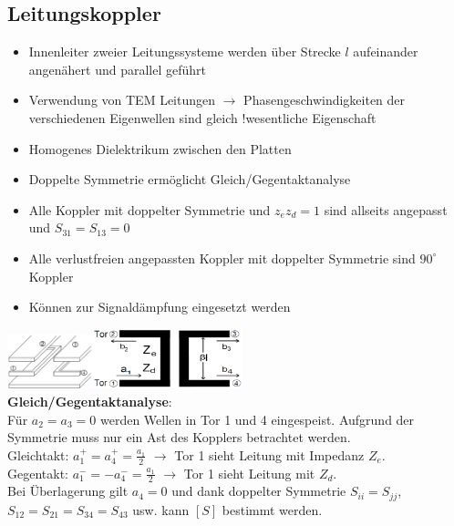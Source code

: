 \documentclass[english]{latex4ei/latex4ei_sheet}
\begin{document}
\begin{sectionbox}
	\subsection{Leitungskoppler}
	\begin{itemize}
		\item Innenleiter zweier Leitungssysteme werden über Strecke $l$ aufeinander angenähert und parallel geführt
		\item Verwendung von TEM Leitungen $\rightarrow$ Phasengeschwindigkeiten der verschiedenen Eigenwellen sind gleich !wesentliche Eigenschaft
		\item Homogenes Dielektrikum zwischen den Platten
		\item Doppelte Symmetrie ermöglicht Gleich/Gegentaktanalyse
		\item Alle Koppler mit doppelter Symmetrie und $z_ez_d = 1$ sind allseits angepasst und $S_{31} = S_{13} = 0$
		\item Alle verlustfreien angepassten Koppler mit doppelter Symmetrie sind $90^{\circ}$ Koppler
		\item Können zur Signaldämpfung eingesetzt werden
	\end{itemize}
	\includegraphics[width = 2.5cm]{./img/leitungskoppler1.png}\includegraphics[width = 4.3cm]{./img/leitungskoppler2.png}\\
	 
	\textbf{Gleich/Gegentaktanalyse}:\\
	Für $a_2 = a_3 = 0$ werden Wellen in Tor 1 und 4 eingespeist. Aufgrund der Symmetrie muss nur ein Ast des Kopplers betrachtet werden.\\
	Gleichtakt: $a_1^+ = a_4^+ = \frac{a_1}{2}$ $\rightarrow$ Tor 1 sieht Leitung mit Impedanz $Z_e$.\\
	Gegentakt: $a_1^- = -a_4^- = \frac{a_1}{2}$ $\rightarrow$ Tor 1 sieht Leitung mit $Z_d$.\\
	Bei Überlagerung gilt $a_4 = 0$ und dank doppelter Symmetrie $S_{ii} = S_{jj}$, $S_{12} = S_{21} = S_{34} = S_{43}$ usw. kann $[S]$ bestimmt werden.


\end{sectionbox}
\end{document}

